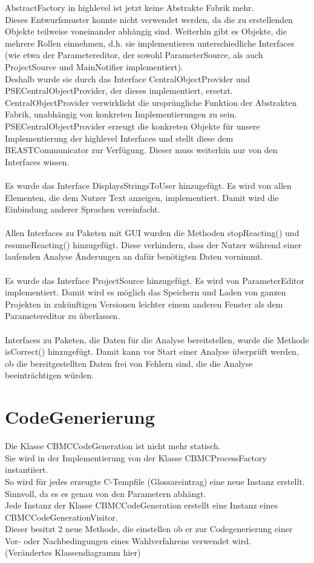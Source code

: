 \documentclass[a4paper]{scrreprt}
\begin{document}
AbstractFactory in highlevel ist jetzt keine Abstrakte Fabrik mehr.\\ Dieses Entwurfsmuster konnte nicht verwendet werden, da die zu erstellenden Objekte teilweise voneinander abhängig sind. Weiterhin gibt es Objekte, die mehrere Rollen einnehmen, d.h. sie implementieren unterschiedliche Interfaces (wie etwa der Parametereditor, der sowohl ParameterSource, als auch ProjectSource und MainNotifier implementiert). \\
Deshalb wurde sie durch das Interface CentralObjectProvider und PSECentralObjectProvider, der dieses implementiert, ersetzt. CentralObjectProvider verwirklicht die ursprüngliche Funktion der Abstrakten Fabrik, unabhängig von konkreten Implementierungen zu sein. \\
PSECentralObjectProvider erzeugt die konkreten Objekte für unsere Implementierung der highlevel Interfaces und stellt diese dem BEASTCommunicator zur Verfügung. Dieser muss weiterhin nur von den Interfaces wissen. \\
\\
Es wurde das Interface DisplaysStringsToUser hinzugefügt. Es wird von allen Elementen, die dem Nutzer Text anzeigen, implementiert. Damit wird die Einbindung anderer Sprachen vereinfacht. \\
\\
Allen Interfaces zu Paketen mit GUI wurden die Methoden stopReacting() und resumeReacting() hinzugefügt. Diese verhindern, dass der Nutzer während einer laufenden Analyse Änderungen an dafür benötigten Daten vornimmt. \\
\\
Es wurde das Interface ProjectSource hinzugefügt. Es wird von ParameterEditor implementiert. Damit wird es möglich das Speichern und Laden von ganzen Projekten in zukünftigen Versionen leichter einem anderen Fenster als dem Parametereditor zu überlassen. \\
\\
Interfaces zu Paketen, die Daten für die Analyse bereitstellen, wurde die Methode isCorrect() hinzugefügt. Damit kann vor Start einer Analyse überprüft werden, ob die bereitgestellten Daten frei von Fehlern sind, die die Analyse beeinträchtigen würden.


\section{CodeGenerierung}

Die Klasse CBMCCodeGeneration ist nicht mehr statisch. \\
Sie wird in der Implementierung von der Klasse CBMCProcessFactory instantiiert. \\
So wird für jedes erzeugte C-Tempfile (Glossareintrag) eine neue Instanz erstellt. Sinnvoll, da es es genau von den Parametern abhängt. \\
Jede Instanz der Klasse CBMCCodeGeneration erstellt eine Instanz eines CBMCCodeGenerationVisitor. \\
Dieser besitzt 2 neue Methode, die einstellen ob er zur Codegenerierung einer Vor- oder Nachbedingungen eines Wahlverfahrens verwendet wird.  \\
(Verändertes Klassendiagramm hier)
\end{document}
